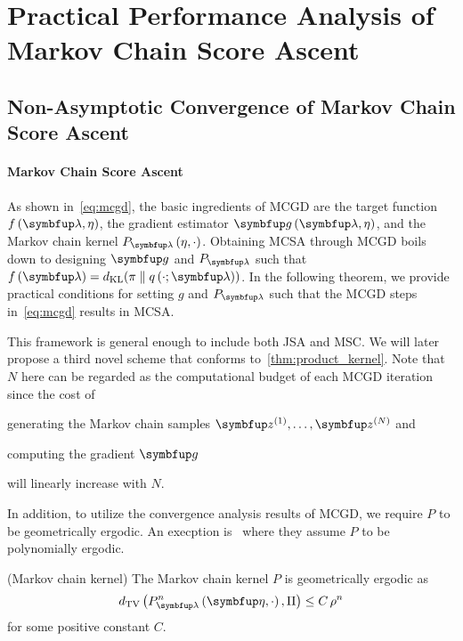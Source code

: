 
\section{Practical Performance Analysis of Markov Chain Score Ascent}
\subsection{Non-Asymptotic Convergence of Markov Chain Score Ascent}\label{section:convergence}

\vspace{-0.05in}
\paragraph{Markov Chain Score Ascent}
As shown in~\cref{eq:mcgd}, the basic ingredients of MCGD are the target function \(f\left(\vlambda, \eta\right)\), the gradient estimator \(\vg\left(\vlambda, \eta\right)\), and the Markov chain kernel \(P_{\vlambda}\left(\eta, \cdot\right)\).
Obtaining MCSA through MCGD boils down to designing \(\vg\) and \(P_{\vlambda}\) such that \(f\left(\vlambda\right) = \DKL{\pi}{q\left(\cdot; \vlambda\right)} \).
In the following theorem, we provide practical conditions for setting \(g\) and \(P_{\vlambda}\) such that the MCGD steps in~\cref{eq:mcgd} results in MCSA.



This framework is general enough to include both JSA and MSC.
We will later propose a third novel scheme that conforms to~\cref{thm:product_kernel}.
Note that \(N\) here can be regarded as the computational budget of each MCGD iteration since the cost of
\begin{enumerate*}[label=\textbf{(\roman*)}]
  \item generating the Markov chain samples \(\vz^{(1)}, \ldots, \vz^{(N)}\) and
  \item computing the gradient \(\vg\)
\end{enumerate*}
will linearly increase with \(N\).

In addition, to utilize the convergence analysis results of MCGD, we require \(P\) to be geometrically ergodic.
An execption is~\citet{debavelaere_convergence_2021} where they assume \(P\) to be polynomially ergodic.
\begin{assumption}{(Markov chain kernel)}\label{thm:kernel_conditions}
\vspace{-0.05in}
  The Markov chain kernel \(P\) is geometrically ergodic as
  {%
  \[
  \DTV{P_{\vlambda}^{n}\left(\veta, \cdot\right)}{ \Pi } \leq C \, \rho^{n}
  \]
  }
  for some positive constant \(C\).
\end{assumption}
\vspace{-0.05in}

